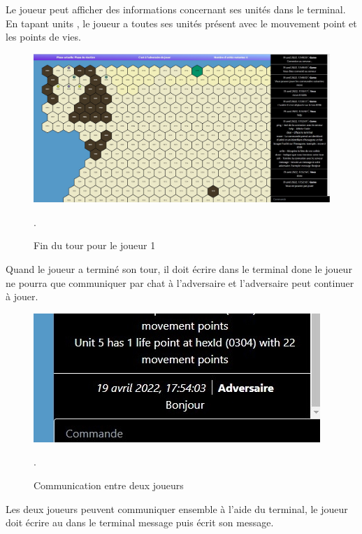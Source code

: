 Le joueur peut afficher des informations concernant ses unités dans le terminal.
En tapant \og units \fg{}, le joueur a toutes ses unités présent avec le mouvement point et  les points de vies.

\begin{figure}[H]
\centering
\includegraphics[scale=0.35]{data/fin tour.jpg}
\caption{Fin du tour pour le joueur 1}.
\end{figure}

Quand le joueur a terminé son tour, il doit écrire dans le terminal \og done \fg{}
le joueur ne pourra que communiquer par chat à l'adversaire et l'adversaire peut continuer à jouer.\\

\begin{figure}[H]
\centering
\includegraphics[scale=0.6]{data/chat .jpg}
\caption{Communication entre deux joueurs}.
\end{figure}
Les deux joueurs peuvent communiquer ensemble  à l'aide du terminal, le joueur doit écrire au dans le terminal \og message \fg{} puis écrit son message.


